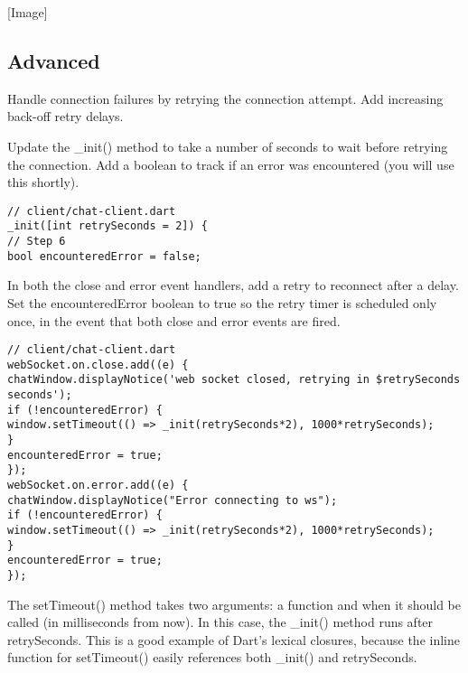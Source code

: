 [Image]

\subsection{Advanced}

Handle connection failures by retrying the connection attempt. Add increasing back-off retry delays.

Update the \_init() method to take a number of seconds to wait before retrying the connection. Add a boolean to track if an error was encountered (you will use this shortly).

\begin{verbatim}
// client/chat-client.dart
_init([int retrySeconds = 2]) {
// Step 6
bool encounteredError = false;
\end{verbatim}

In both the close and error event handlers, add a retry to reconnect after a delay. Set the encounteredError boolean to true so the retry timer is scheduled only once, in the event that both close and error events are fired.

\begin{verbatim}
// client/chat-client.dart
webSocket.on.close.add((e) {
chatWindow.displayNotice('web socket closed, retrying in $retrySeconds
seconds');
if (!encounteredError) {
window.setTimeout(() => _init(retrySeconds*2), 1000*retrySeconds);
}
encounteredError = true;
});
webSocket.on.error.add((e) {
chatWindow.displayNotice("Error connecting to ws");
if (!encounteredError) {
window.setTimeout(() => _init(retrySeconds*2), 1000*retrySeconds);
}
encounteredError = true;
});
\end{verbatim}

The setTimeout() method takes two arguments: a function and when it should be called (in milliseconds from now). In this case, the \_init() method runs after retrySeconds. This is a good example of Dart’s lexical closures, because the inline function for setTimeout() easily references both \_init() and retrySeconds.


